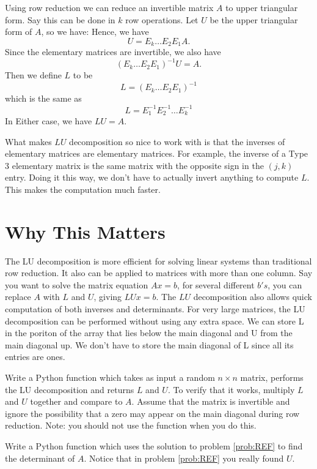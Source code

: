 Using row reduction we can reduce an invertible matrix $A$ to upper triangular form.
Say this can be done in $k$ row operations.
Let $U$ be the upper triangular form of $A$, so we have:
Hence, we have
\[
U = E_k \dots E_2 E_1 A.
\]
Since the elementary matrices are invertible, we also have
\[
(E_k \dots E_2 E_1)^{-1} U =  A.
\]
Then we define $L$ to be
\[
L = (E_k \dots E_2 E_1)^{-1}
\]
which is the same as
\[
L = E_1^{-1} E_2^{-1} \dots E_k^{-1}
\]
In Either case, we have $L U = A$.

What makes $LU$ decomposition so nice to work with is that the inverses of elementary matrices are elementary matrices.
For example, the inverse of a Type 3 elementary matrix is the same matrix with the opposite sign in the $(j,k)$ entry.
Doing it this way, we don't have to actually invert anything to compute $L$.
This makes the computation much faster.

\section*{Why This Matters}

The LU decomposition is more efficient for solving linear systems than traditional row reduction.
It also can be applied to matrices with more than one column.
Say you want to solve the matrix equation $A x = b$, for several different $b's$, you can replace $A$ with $L$ and $U$, giving $L U x = b$.
The $LU$ decomposition also allows quick computation of both inverses and determinants.
For very large matrices, the LU decomposition can be performed without using any extra space.
We can store L in the poriton of the array that lies below the main diagonal and U from the main diagonal up.
We don't have to store the main diagonal of L since all its entries are ones.

\begin{problem}
\label{prob:LU}
Write a Python function which takes as input a random $n\times n$ matrix, performs the LU decomposition and returns $L$ and $U$.
To verify that it works, multiply $L$ and $U$ together and compare to $A$.
Assume that the matrix is invertible and ignore the possibility that a zero may appear on the main diagonal during row reduction.
Note: you should not use the  function when you do this.
\end{problem}

\begin{problem}
\label{prob:det}
Write a Python function which uses the solution to problem \ref{prob:REF} to find the determinant of $A$.
Notice that in problem \ref{prob:REF} you really found $U$.
\end{problem}
